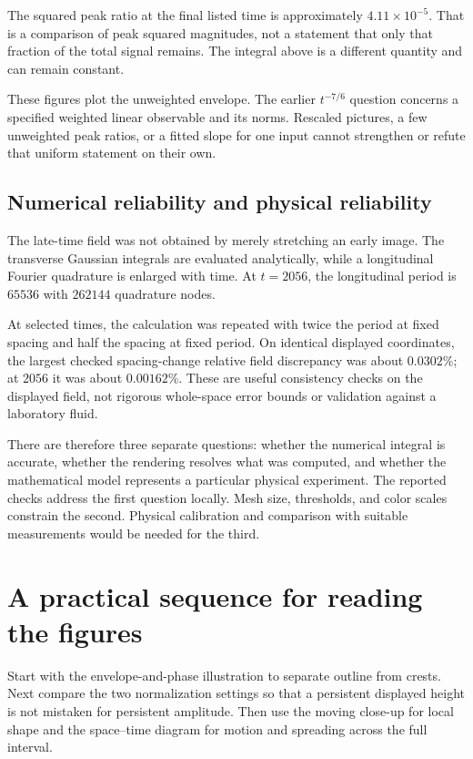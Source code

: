 \documentclass[10pt]{article}
\begin{document}
The squared peak ratio at the final listed time is approximately $4.11\times10^{-5}$. That is a comparison of peak squared magnitudes, not a statement that only that fraction of the total signal remains. The integral above is a different quantity and can remain constant.

These figures plot the unweighted envelope. The earlier $t^{-7/6}$ question concerns a specified weighted linear observable and its norms. Rescaled pictures, a few unweighted peak ratios, or a fitted slope for one input cannot strengthen or refute that uniform statement on their own.

\subsection{Numerical reliability and physical reliability}
The late-time field was not obtained by merely stretching an early image. The transverse Gaussian integrals are evaluated analytically, while a longitudinal Fourier quadrature is enlarged with time. At $t=2056$, the longitudinal period is $65536$ with $262144$ quadrature nodes.

At selected times, the calculation was repeated with twice the period at fixed spacing and half the spacing at fixed period. On identical displayed coordinates, the largest checked spacing-change relative field discrepancy was about $0.0302\%$; at $2056$ it was about $0.00162\%$. These are useful consistency checks on the displayed field, not rigorous whole-space error bounds or validation against a laboratory fluid.

There are therefore three separate questions: whether the numerical integral is accurate, whether the rendering resolves what was computed, and whether the mathematical model represents a particular physical experiment. The reported checks address the first question locally. Mesh size, thresholds, and color scales constrain the second. Physical calibration and comparison with suitable measurements would be needed for the third.

\section{A practical sequence for reading the figures}
Start with the envelope-and-phase illustration to separate outline from crests. Next compare the two normalization settings so that a persistent displayed height is not mistaken for persistent amplitude. Then use the moving close-up for local shape and the space--time diagram for motion and spreading across the full interval.
\end{document}
